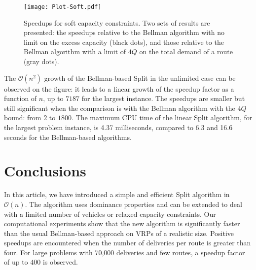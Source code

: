\documentclass[11pt]{article}
\newcommand{\cO}{{\mathcal O}}
\begin{document}
\begin{figure}[htbp]
\centering
\vspace*{-0.2cm}
\texttt{[image: Plot-Soft.pdf]}
\caption{Speedups for soft capacity constraints. Two sets of results are presented: the speedups relative to the Bellman algorithm with no limit on the excess capacity (black dots),  and those relative to the Bellman algorithm with a limit of $4Q$ on the total demand of a route (gray dots).}
\label{SpeedupSoft}
\end{figure}

The $\cO(n^2)$ growth of the Bellman-based Split in the unlimited case can be observed on the figure: it leads to a linear growth of the speedup factor as a function of $n$, up to $7187$ for the largest instance.
The speedups are smaller but still significant when the comparison is with the Bellman algorithm with the $4Q$ bound: from $2$ to $1800$. The maximum CPU time of the linear Split algorithm, for the largest problem instance, is 4.37 milliseconds, compared to 6.3 and 16.6 seconds for the Bellman-based algorithms.

\section{Conclusions}
\label{sectionConclusions}

In this article, we have introduced a simple and efficient Split algorithm in $\cO(n)$.
The algorithm uses dominance properties and can be extended to deal with a limited number of vehicles or relaxed capacity constraints. Our computational experiments show that the new algorithm is significantly faster than the usual Bellman-based approach on VRPs of a realistic size. Positive speedups are encountered when the number of deliveries per route is greater than four. For large problems with 70,000 deliveries and few routes, a speedup factor of up to $400$ is observed.
\end{document}
